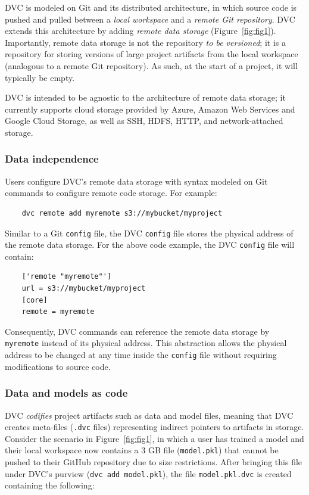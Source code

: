 \documentclass[10pt,sigconf, authordraft]{acmart}
\begin{document}
DVC is modeled on Git and its distributed architecture, in which source code is pushed and pulled between a \textit{local workspace} and a \textit{remote Git repository}. DVC extends this architecture by adding \textit{remote data storage} (Figure~\ref{fig:fig1}). Importantly, remote data storage is not the repository \textit{to be versioned}; it is a repository for storing versions of large project artifacts from the local workspace (analogous to a remote Git repository). As such, at the start of a project, it will typically be empty. 

DVC is intended to be agnostic to the architecture of remote data storage; it currently supports cloud storage provided by Azure, Amazon Web Services and Google Cloud Storage, as well as SSH, HDFS, HTTP, and network-attached storage.  

\subsubsection{Data independence} Users configure DVC's remote data storage with syntax modeled on Git commands to configure remote code storage. For example:

\begin{verbatim}
    dvc remote add myremote s3://mybucket/myproject
\end{verbatim}


Similar to a Git \verb|config| file, the DVC \verb|config| file stores the physical address of the remote data storage. For the above code example, the DVC \verb|config| file will contain:

\begin{verbatim}
    ['remote "myremote"']
    url = s3://mybucket/myproject
    [core]
    remote = myremote
\end{verbatim}

Consequently, DVC commands can reference the remote data storage by \verb|myremote| instead of its physical address. This abstraction allows the physical address to be changed at any time inside the \verb|config| file without requiring modifications to source code.

\subsubsection{Data and models as code} 
DVC \textit{codifies} project artifacts such as data and model files, meaning that DVC creates meta-files (\verb|.dvc| files) representing indirect pointers to artifacts in storage. Consider the scenario in Figure~\ref{fig:fig1}, in which a user has trained a model and their local workspace now contains a 3 GB file (\verb|model.pkl|) that cannot be pushed to their GitHub repository due to size restrictions. After bringing this file under DVC's purview (\verb|dvc add model.pkl|), the file \verb|model.pkl.dvc| is created containing the following:
\end{document}
